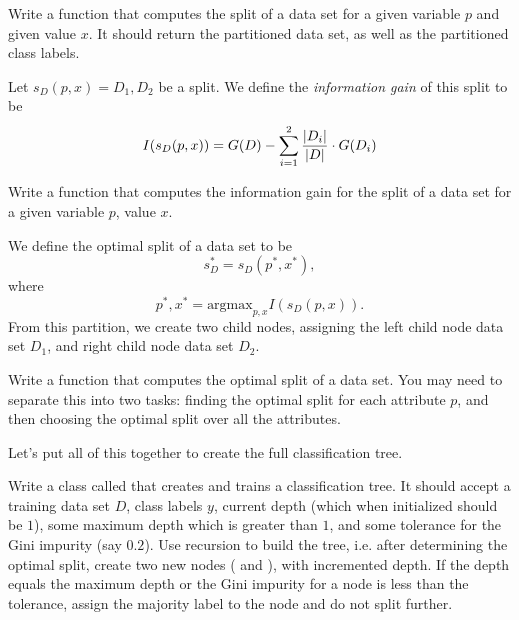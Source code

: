 \begin{problem}
Write a function that computes the split of a data set for a given variable $p$ and given value $x$. It should return the partitioned data set, as well as the partitioned class labels.
\end{problem}

\begin{definition}
Let $s_{D}(p,x) = D_{1},D_{2}$ be a split. We define the \emph{information gain} of this split to be 
\begin{equation*}
I(s_{D}(p,x)) = G(D) - \sum_{i=1}^{2} \frac{\left\lvert D_{i}\right\rvert}{\left\lvert D\right\rvert} \cdot G(D_{i})
\end{equation*}
\end{definition}

\begin{problem}
Write a function that computes the information gain for the split of a data set for a given variable $p$, value $x$.
\end{problem}

We define the optimal split of a data set to be
\begin{equation*}
s_{D}^{*} = s_{D}(p^{*}, x^{*}),
\end{equation*}
where 
\begin{equation*}
p^{*}, x^{*} = \text{argmax}_{p,x} I(s_{D}(p,x)).
\end{equation*}
From this partition, we create two child nodes, assigning the left child node data set $D_{1}$, and right child node data set $D_{2}$.

\begin{problem}
Write a function that computes the optimal split of a data set. You may need to separate this into two tasks: finding the optimal split for each attribute $p$, and then choosing the optimal split over all the attributes.
\end{problem}

Let's put all of this together to create the full classification tree.

\begin{problem}
Write a class called  that creates and trains a classification tree. It should accept a training data set $D$, class labels $y$, current depth (which when initialized should be $1$), some maximum depth which is greater than $1$, and some tolerance for the Gini impurity (say $0.2$). Use recursion to build the tree, i.e. after determining the optimal split, create two new nodes ( and ), with incremented depth. If the depth equals the maximum depth or the Gini impurity for a node is less than the tolerance, assign the majority label to the node and do not split further.
\end{problem}

